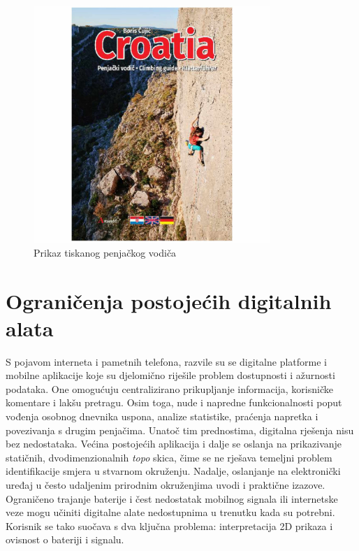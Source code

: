 \begin{figure}[H]
    \centering
    \includegraphics[width=0.8\textwidth]{images/uvod/tradicionalni_vodic.jpg}
    \caption{Prikaz tiskanog penjačkog vodiča}
\end{figure}

\section{Ograničenja postojećih digitalnih alata}

S pojavom interneta i pametnih telefona, razvile su se digitalne platforme i mobilne aplikacije koje su djelomično riješile problem dostupnosti i ažurnosti podataka. One omogućuju centralizirano prikupljanje informacija, korisničke komentare i lakšu pretragu. Osim toga, nude i napredne funkcionalnosti poput vođenja osobnog dnevnika uspona, analize statistike, praćenja napretka i povezivanja s drugim penjačima.
Unatoč tim prednostima, digitalna rješenja nisu bez nedostataka. Većina postojećih aplikacija i dalje se oslanja na prikazivanje statičnih, dvodimenzionalnih \textit{topo} skica, čime se ne rješava temeljni problem identifikacije smjera u stvarnom okruženju. Nadalje, oslanjanje na elektronički uređaj u često udaljenim prirodnim okruženjima uvodi i praktične izazove. Ograničeno trajanje baterije i čest nedostatak mobilnog signala ili internetske veze mogu učiniti digitalne alate nedostupnima u trenutku kada su potrebni. Korisnik se tako suočava s dva ključna problema: interpretacija 2D prikaza i ovisnost o bateriji i signalu.


